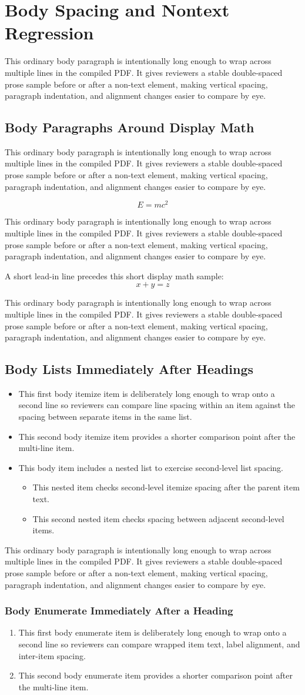 \documentclass{ndsudisq}
\newcommand{\spacingfiller}{This ordinary body paragraph is intentionally long enough to wrap across multiple lines in the compiled PDF. It gives reviewers a stable double-spaced prose sample before or after a non-text element, making vertical spacing, paragraph indentation, and alignment changes easier to compare by eye.}
\begin{document}
\mainmattersetup

\chapter{Body Spacing and Nontext Regression}
\label{chap:spacing-body}

\spacingfiller

\section{Body Paragraphs Around Display Math}
\label{sec:body-display-math}
\spacingfiller

\begin{equation}
E = mc^2
\label{eq:spacing-standard-display}
\end{equation}

\spacingfiller

A short lead-in line precedes this short display math sample:
\[
x+y=z
\]

\spacingfiller

\section{Body Lists Immediately After Headings}
\label{sec:body-lists}
\begin{itemize}
  \item This first body itemize item is deliberately long enough to wrap onto a second line so reviewers can compare line spacing within an item against the spacing between separate items in the same list.
  \item This second body itemize item provides a shorter comparison point after the multi-line item.
  \item This body item includes a nested list to exercise second-level list spacing.
    \begin{itemize}
      \item This nested item checks second-level itemize spacing after the parent item text.
      \item This second nested item checks spacing between adjacent second-level items.
    \end{itemize}
\end{itemize}

\spacingfiller

\subsection{Body Enumerate Immediately After a Heading}
\begin{enumerate}
  \item This first body enumerate item is deliberately long enough to wrap onto a second line so reviewers can compare wrapped item text, label alignment, and inter-item spacing.
  \item This second body enumerate item provides a shorter comparison point after the multi-line item.
\end{enumerate}
\end{document}
